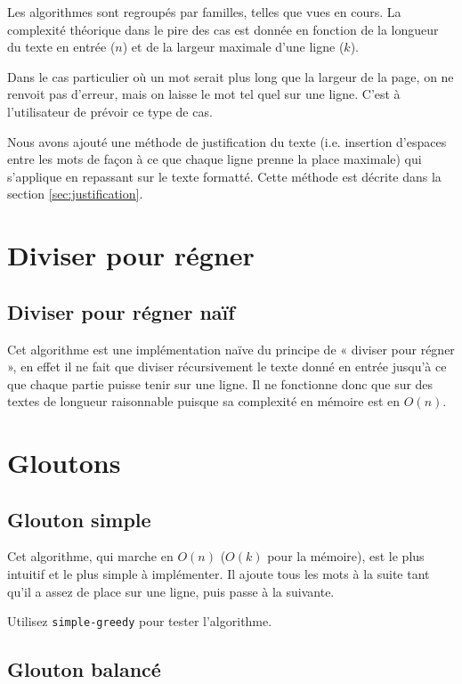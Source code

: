 \documentclass[a4paper, 11pt]{article}
\begin{document}
Les algorithmes sont regroupés par familles, telles que vues en cours.
La complexité théorique dans le pire des cas est donnée en fonction de la
longueur du texte en entrée ($n$) et de la largeur maximale d'une ligne ($k$).

Dans le cas particulier où un mot serait plus long que la largeur de la page, on
ne renvoit pas d'erreur, mais on laisse le mot tel quel sur une ligne. C'est à
l'utilisateur de prévoir ce type de cas.

Nous avons ajouté une méthode de justification du texte (i.e. insertion
d'espaces entre les mots de façon à ce que chaque ligne prenne la place
maximale) qui s'applique en repassant sur le texte formatté. Cette méthode est
décrite dans la section \ref{sec:justification}.

\section{Diviser pour régner}

\subsection{Diviser pour régner naïf}

Cet algorithme est une implémentation naïve du principe de « diviser pour régner
», en effet il ne fait que diviser récursivement le texte donné en entrée
jusqu'à ce que chaque partie puisse tenir sur une ligne. Il ne fonctionne donc
que sur des textes de longueur raisonnable puisque sa complexité en mémoire est
en $O(n)$. %

\section{Gloutons}

\subsection{Glouton simple}
\label{sec:simple-greedy}

Cet algorithme, qui marche en $O(n)$ ($O(k)$ pour la mémoire), est le plus
intuitif et le plus simple à implémenter. Il ajoute tous les mots à la suite
tant qu'il a assez de place sur une ligne, puis passe à la suivante.

Utilisez \verb|simple-greedy| pour tester l’algorithme.

\subsection{Glouton balancé}
\label{sec:balanced-greedy}
\end{document}
